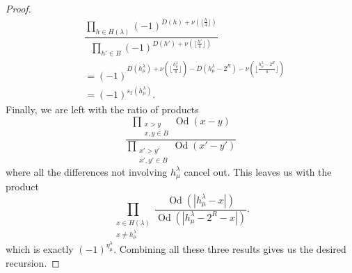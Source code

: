 \documentclass[12pt]{amsart}
\theoremstyle{definition}
\numberwithin{equation}{section}
\newcommand{\la}{\lambda}
\DeclareMathOperator{\Od}{Od}
\begin{document}
\begin{proof}
\begin{align*}
&\dfrac{\prod\limits_{h\in H(\lambda)} (-1)^{D(h) + \nu(\lfloor \frac{h}{4} \rfloor)}}{\prod\limits_{h'\in B} (-1)^{D(h') + \nu(\lfloor \frac{h'}{4} \rfloor)}}\\ &= (-1)^{D(h^\lambda_\mu) + \nu(\lfloor \frac{h^\lambda_\mu}{4} \rfloor) - {D(h^\lambda_\mu - 2^R) - \nu(\lfloor \frac{h^\lambda_\mu - 2^R}{4}\rfloor)}} \\&= (-1)^{s_2(h^\lambda_\mu)}.
\end{align*} 
Finally, we are left with the ratio of products 
\[
\dfrac{\prod\limits_{\substack{x> y\\ x,y\in B}} \Od(x-y)}{\prod\limits_{\substack{x'> y'\\ x',y'\in B}} \Od(x'-y')}
\]
where all the differences not involving $h^\la_\mu$ cancel out. This leaves us with the product \[ \prod\limits_{\substack{x \in H(\lambda)\\ x \neq h^\lambda_\mu}} \dfrac{\Od(|h^\lambda_\mu- x|)}{\Od(|h^\lambda_\mu - 2^R - x|)}.
\] which is exactly $(-1)^{\eta^\la_\mu}$.
Combining all these three results gives us the desired recursion.
\end{proof}
\end{document}

